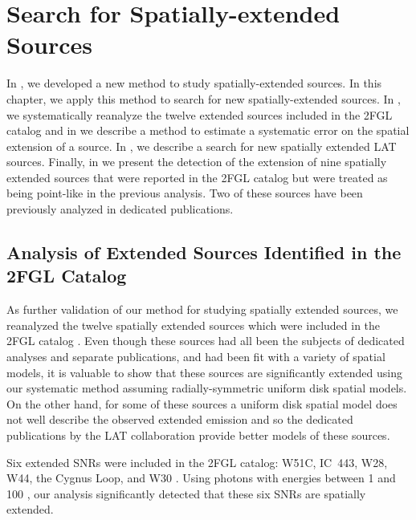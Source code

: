 \chapter{Search for Spatially-extended  Sources}


In , we developed a new method to study
spatially-extended sources.  In this chapter, we apply this method to
search for new spatially-extended sources.  In ,
we systematically reanalyze the twelve extended sources included in
the \ac{2FGL} catalog and in 
we describe a method to estimate a systematic error on the spatial
extension of a source.  In , we
describe a search for new spatially extended \ac{LAT} sources. Finally,
in  we present the detection of the extension
of nine spatially extended sources that were reported in the \ac{2FGL}
catalog but were treated as being point-like in the previous analysis.
Two of these sources have been previously analyzed in dedicated
publications.

\section{Analysis of Extended Sources Identified in the 2FGL Catalog}

As further validation of our method for studying spatially extended
sources, we reanalyzed the twelve spatially extended sources which were
included in the 2FGL catalog \citep{nolan_2012_fermi-large}.  Even though
these sources had all been the subjects of dedicated analyses and separate
publications, and had been fit with a variety of spatial models, it is
valuable to show that these sources are significantly extended using our
systematic method assuming radially-symmetric uniform disk spatial models.
On the other hand, for some of these sources a uniform disk spatial
model does not well describe the observed extended emission and so the
dedicated publications by the LAT collaboration provide better models
of these sources.

Six extended SNRs were included in the
2FGL catalog: W51C, IC~443, W28, W44, the Cygnus Loop, and W30
\citep{abdo_2009a_fermi-discovery,abdo_2010a_observation-supernova,abdo_2010d_fermi-large,abdo_2010a_gamma-ray-emission,katagiri_2011a_fermi-large,ajello_2012a_fermi-large}.
Using photons with energies between 1 \gev and 100 \gev, our analysis
significantly detected that these six SNRs are spatially extended.

